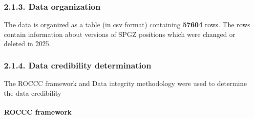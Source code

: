 \documentclass[
]{article}
\begin{document}
\subsubsection{\texorpdfstring{\textbf{2.1.3. Data
organization}}{2.1.3. Data organization}}\label{data-organization}

The data is organized as a table (in csv format) containing
\textbf{57604} rows. The rows contain information about versions of SPGZ
positions which were changed or deleted in 2025.

\subsubsection{\texorpdfstring{\textbf{2.1.4. Data credibility
determination}}{2.1.4. Data credibility determination}}\label{data-credibility-determination}

The ROCCC framework and Data integrity methodology were used to
determine the data credibility

\paragraph{\texorpdfstring{\textbf{ROCCC
framework}}{ROCCC framework}}\label{roccc-framework}
\end{document}
